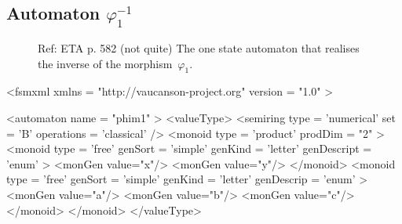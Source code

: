 \subsection{Automaton $\varphi_{1}^{-1}$}
\label{automatonPhim1}

\begin{figure}[h]
  \begin{minipage}[c]{.66\textwidth}
    Ref: ETA p. 582  (not quite)
    The one state automaton that realises the inverse of the morphism~$\varphi_{1}$.
  \end{minipage}
  \begin{minipage}[c]{.34\textwidth}


  \end{minipage}
\end{figure}

{\footnotesize
\begin{listing}[5]{1}
<fsmxml  xmlns   = "http://vaucanson-project.org"
         version = "1.0" >

<automaton name = "phim1" >
  <valueType>
    <semiring  type       = 'numerical'
               set        = 'B'
               operations = 'classical' />
    <monoid    type       = 'product'
               prodDim    = "2" >
      <monoid    type        = 'free'
                 genSort     = 'simple'
                 genKind     = 'letter'
                 genDescript = 'enum' >
        <monGen value="x"/>
        <monGen value="y"/>
      </monoid>
      <monoid    type       = 'free'
                 genSort    = 'simple'
                 genKind    = 'letter'
                 genDescrip = 'enum' >
        <monGen value="a"/>
        <monGen value="b"/>
        <monGen value="c"/>
      </monoid>
    </monoid>
  </valueType>
\end{listing}
}

\newpage

